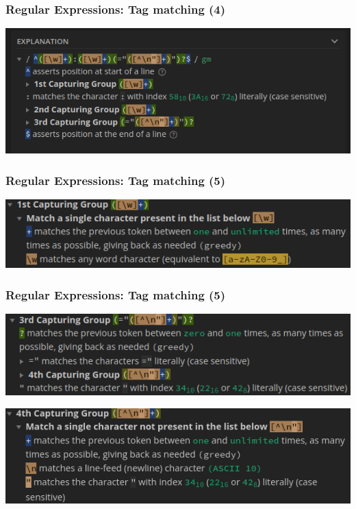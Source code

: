 \documentclass{beamer}
\begin{document}
\begin{frame}[fragile]
    \frametitle{Regular Expressions: Tag matching (4)}
    \begin{center}
        \includegraphics[width=1.0\textwidth]{pics/regex/regex_tag1.png}
    \end{center}
\end{frame}

\begin{frame}[fragile]
    \frametitle{Regular Expressions: Tag matching (5)}
    \begin{center}
        \includegraphics[width=1.0\textwidth]{pics/regex/regex_tag2.png}
    \end{center}
\end{frame}

\begin{frame}[fragile]
    \frametitle{Regular Expressions: Tag matching (5)}
    \begin{center}
        \includegraphics[width=1.0\textwidth]{pics/regex/regex_tag3.png}
    \end{center}
    \begin{center}
        \includegraphics[width=1.0\textwidth]{pics/regex/regex_tag4.png}
    \end{center}
\end{frame}
\end{document}
